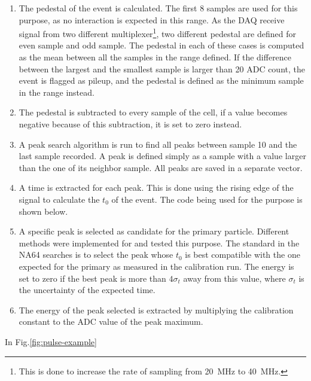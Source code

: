 \begin{enumerate}
\item The pedestal of the event is calculated. The first 8 samples are used for this purpose, as no interaction is expected in this range. As the DAQ receive signal from two different multiplexer\footnote{This is done to increase the rate of sampling from \SI{20}{\mega\hertz} to \SI{40}{\mega\hertz}.}, two different pedestal are defined for even sample and odd sample. The pedestal in each of these cases is computed as the mean between all the samples in the range defined. If the difference between the largest and the smallest sample is larger than 20 ADC count, the event is flagged as pileup, and the pedestal is defined as the minimum sample in the range instead.
\item The pedestal is subtracted to every sample of the cell, if a value becomes negative because of this subtraction, it is set to zero instead.
\item A peak search algorithm is run to find all peaks between sample 10 and the last sample recorded. A peak is defined simply as a sample with a value larger than the one of its neighbor sample. All peaks are saved in a separate vector.
\item A time is extracted for each peak. This is done using the rising edge of the signal to calculate the $t_0$ of the event. The code being used for the purpose is shown below.
\item A specific peak is selected as candidate for the primary particle. Different methods were implemented for and tested this purpose. The standard in the NA64 searches is to select the peak whose $t_0$ is best compatible with the one expected for the primary as measured in the calibration run. The energy is set to zero if the best peak is more than $4\sigma_t$ away from this value, where $\sigma_t$ is the uncertainty of the expected time.
\item The energy of the peak selected is extracted by multiplying the calibration constant to the ADC value of the peak maximum.
\end{enumerate}

In Fig.\ref{fig:pulse-example}

